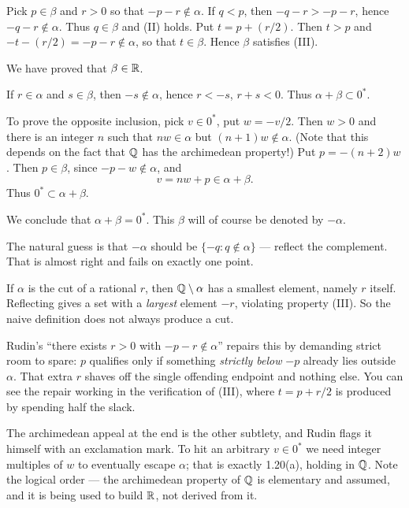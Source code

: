 \begin{enumerate}[label=(A\arabic*), leftmargin=3.1em, itemsep=6pt, topsep=5pt]
        Pick $p \in \beta$ and $r > 0$ so that $-p-r \notin \alpha$. If
        $q < p$, then $-q-r > -p-r$, hence $-q-r \notin \alpha$. Thus
        $q \in \beta$ and (II) holds. Put $t = p+(r/2)$. Then $t > p$ and
        $-t-(r/2) = -p-r \notin \alpha$, so that $t \in \beta$. Hence $\beta$
        satisfies (III).

        We have proved that $\beta \in \mathbb{R}$.

        If $r \in \alpha$ and $s \in \beta$, then $-s \notin \alpha$, hence
        $r < -s$, $r+s < 0$. Thus $\alpha+\beta \subset 0^*$.

        To prove the opposite inclusion, pick $v \in 0^*$, put $w = -v/2$. Then
        $w > 0$ and there is an integer $n$ such that $nw \in \alpha$ but
        $(n+1)w \notin \alpha$. (Note that this depends on the fact that $\mathbb{Q}$
        has the archimedean property!) Put $p = -(n+2)w$. Then $p \in \beta$,
        since $-p-w \notin \alpha$, and
        \[ v = nw + p \in \alpha+\beta. \]
        Thus $0^* \subset \alpha+\beta$.

        We conclude that $\alpha+\beta = 0^*$. This $\beta$ will of course be
        denoted by $-\alpha$.
\end{enumerate}

\begin{unpack}
The natural guess is that $-\alpha$ should be $\{-q : q \notin \alpha\}$ ---
reflect the complement. That is almost right and fails on exactly one point.

If $\alpha$ is the cut of a rational $r$, then $\mathbb{Q} \setminus \alpha$ has a
smallest element, namely $r$ itself. Reflecting gives a set with a
\emph{largest} element $-r$, violating property (III). So the naive definition
does not always produce a cut.

Rudin's ``there exists $r>0$ with $-p-r \notin \alpha$'' repairs this by
demanding strict room to spare: $p$ qualifies only if something \emph{strictly
below} $-p$ already lies outside $\alpha$. That extra $r$ shaves off the single
offending endpoint and nothing else. You can see the repair working in the
verification of (III), where $t = p + r/2$ is produced by spending half the
slack.

The archimedean appeal at the end is the other subtlety, and Rudin flags it
himself with an exclamation mark. To hit an arbitrary $v \in 0^*$ we need
integer multiples of $w$ to eventually escape $\alpha$; that is exactly 1.20(a),
holding in $\mathbb{Q}$. Note the logical order --- the archimedean property of $\mathbb{Q}$ is
elementary and assumed, and it is being used to build $\mathbb{R}$, not derived from it.
\end{unpack}

